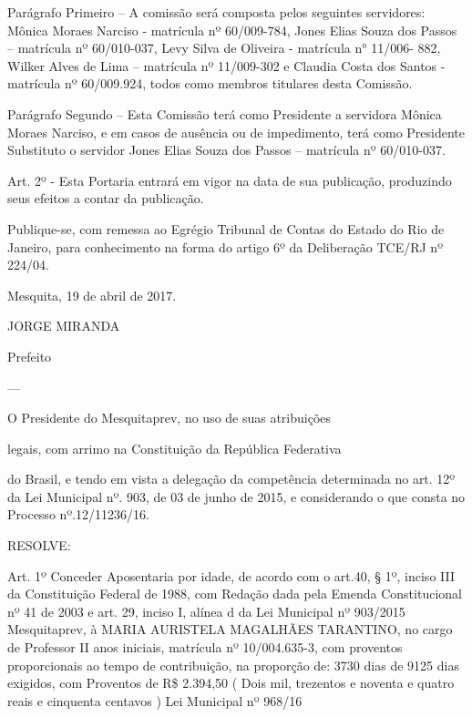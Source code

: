 \documentclass{doliberto}
\begin{document}
Parágrafo  Primeiro  –  A  comissão  será  composta  pelos 
seguintes servidores: Mônica Moraes Narciso - matrícula nº 
60/009-784,  Jones  Elias  Souza  dos  Passos  –  matrícula  nº 
60/010-037, Levy  Silva  de  Oliveira  -  matrícula  n°  11/006-
882,  Wilker  Alves  de  Lima  –  matrícula  nº  11/009-302  e 
Claudia Costa dos Santos - matrícula nº 60/009.924, todos 
como membros titulares desta Comissão. 
 
Parágrafo Segundo – Esta Comissão terá como Presidente a 
servidora  Mônica  Moraes  Narciso,  e  em  casos  de  ausência 
ou  de  impedimento,  terá  como  Presidente  Substituto  o 
servidor  Jones  Elias  Souza  dos  Passos  –  matrícula  nº 
60/010-037. 

 
Art.  2º  -  Esta  Portaria  entrará  em  vigor  na  data  de  sua 
publicação, produzindo seus efeitos a contar da publicação. 
 
Publique-se, com remessa ao Egrégio Tribunal de Contas do 
Estado  do  Rio  de  Janeiro,  para  conhecimento  na  forma  do 
artigo 6º da Deliberação TCE/RJ nº 224/04. 
 
Mesquita, 19 de abril de 2017. 
 
 

JORGE MIRANDA 

Prefeito 

---

O  Presidente  do  Mesquitaprev,  no  uso  de  suas  atribuições 
 
legais, com arrimo na Constituição da República Federativa 
 
do  Brasil,  e  tendo  em  vista  a  delegação  da  competência 
determinada no art. 12º da Lei Municipal nº. 903, de 03 de 
junho  de  2015,  e  considerando  o  que  consta  no  Processo 
nº.12/11236/16. 
                                                                                                                                
RESOLVE: 
 
Art. 1º Conceder Aposentaria  por  idade, de acordo com o 
art.40, § 1º, inciso III da Constituição Federal de 1988, com 
Redação dada pela Emenda Constitucional nº 41 de 2003 e 
art.  29,  inciso  I,  alínea  d  da  Lei  Municipal  nº  903/2015 
Mesquitaprev,  à  MARIA  AURISTELA  MAGALHÃES 
TARANTINO,  no  cargo  de  Professor  II  anos  iniciais, 
matrícula nº 10/004.635-3, com proventos proporcionais ao 
tempo de contribuição,  na proporção de: 3730 dias de 9125 
dias  exigidos,  com  Proventos  de  R\$  2.394,50  (  Dois  mil, 
trezentos e noventa e quatro reais e cinquenta centavos ) Lei 
Municipal nº 968/16 
 
\end{document}
